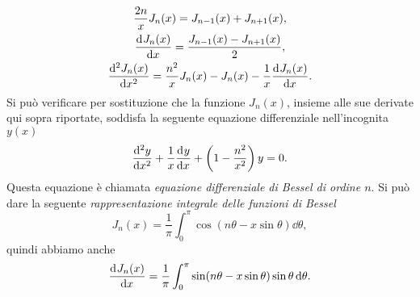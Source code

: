 \begin{subequations}
  \begin{gather}
    \frac{2n}{x} J_n(x) = J_{n-1}(x) + J_{n+1}(x),\\
    \toder{J_n(x)}{x} = \frac{J_{n-1}(x) - J_{n+1}(x)}{2},\\
    \toder[2]{J_n(x)}{x} = \frac{n^2}{x}J_n(x) - J_n(x) -
    \frac{1}{x}\toder{J_n(x)}{x}.
  \end{gather}
\end{subequations}
Si può verificare per sostituzione che la funzione $J_n(x)$, insieme alle sue
derivate qui sopra riportate, soddisfa la seguente equazione differenziale
nell'incognita $y(x)$
\begin{equation}
  \toder[2]{y}{x} + \frac{1}{x}\toder{y}{x} +
  \left(
    1 - \frac{n^2}{x^2}
  \right)y = 0.
\end{equation}
Questa equazione è chiamata \emph{equazione differenziale di Bessel di ordine
  $n$}. Si può dare la seguente \emph{rappresentazione integrale delle funzioni
  di Bessel}
\begin{equation}
  \label{eq:bessel-integrale}
  J_n(x) = \frac{1}{\pi} \int_0^\pi\cos(n\theta - x\sin\theta)\dd\theta,
\end{equation}
quindi abbiamo anche
\begin{equation}
  \label{eq:bessel-derivata-integrale}
  \toder{J_n(x)}{x} = \frac{1}{\pi}\int_0^\pi\sin(n\theta -
  x\sin\theta)\sin\theta\dd\theta.
\end{equation}

